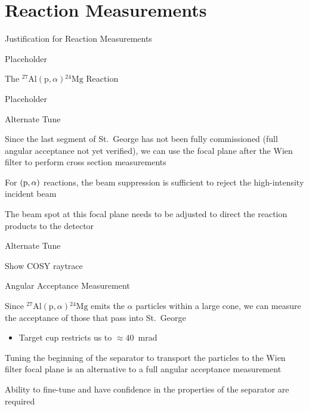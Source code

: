 \documentclass[10pt]{beamer}
\newcommand{\mnuc}[2]{{}^{#1}\textrm{#2}}
\newcommand{\react}[4]{$#1(#2,#3)#4$}
\newcommand{\alpa}{\react{\mnuc{27}{Al}}{\textrm{p}}{\alpha}{\mnuc{24}{Mg}}}
\begin{document}
\section{Reaction Measurements}

\begin{frame}[fragile]{Justification for Reaction Measurements}

    Placeholder

\end{frame}

\begin{frame}[fragile]{The \alpa{} Reaction}

    Placeholder

\end{frame}

\begin{frame}[fragile]{Alternate Tune}

    Since the last segment of St.\ George has not been fully
    commissioned (full angular acceptance not yet verified), we can use
    the focal plane after the Wien filter to perform cross section
    measurements

    For $({\rm p},\alpha)$ reactions, the beam suppression is sufficient
    to reject the high-intensity incident beam

    The beam spot at this focal plane needs to be adjusted to direct the
    reaction products to the detector

\end{frame}

\begin{frame}[fragile]{Alternate Tune}

    Show COSY raytrace

\end{frame}

\begin{frame}[fragile]{Angular Acceptance Measurement}

    Since \alpa{} emits the $\alpha$ particles within a large cone, we
    can measure the acceptance of those that pass into St.\ George
    \begin{itemize}
        \item Target cup restricts us to $\approx 40$~mrad
    \end{itemize}

    Tuning the beginning of the separator to transport the particles to
    the Wien filter focal plane is an alternative to a full angular
    acceptance measurement

    Ability to fine-tune and have confidence in the properties of the
    separator are required

\end{frame}
\end{document}
